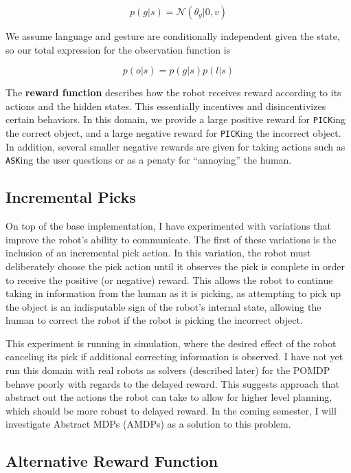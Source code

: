 \documentclass{article}
\begin{document}
$$ p(g|s) = \mathcal{N}(\theta_g| 0, v)$$

We assume language and gesture are conditionally independent given the state, so our total expression for the observation function is 

$$ p(o|s) = p(g|s) p(l|s)$$


The \textbf{reward function} describes how the robot receives reward according to its actions and the hidden states. This essentially incentives and disincentivizes certain behaviors. In this domain, we provide a large positive reward for \texttt{PICK}ing the correct object, and a large negative reward for \texttt{PICK}ing the incorrect object. In addition, several smaller negative rewards are given for taking actions such as \texttt{ASK}ing the user questions or as a penaty for ``annoying'' the human. 

\subsection{Incremental Picks}

On top of the base implementation, I have experimented with variations that improve the robot's ability to communicate. The first of these variations is the inclusion of an incremental pick action. In this variation, the robot must deliberately choose the pick action until it observes the pick is complete in order to receive the positive (or negative) reward. This allows the robot to continue taking in information from the human as it is picking, as attempting to pick up the object is an indisputable sign of the robot's internal state, allowing the human to correct the robot if the robot is picking the incorrect object. 

This experiment is running in simulation, where the desired effect of the robot canceling its pick if additional correcting information is observed. I have not yet run this domain with real robots as solvers (described later) for the POMDP behave poorly with regards to the delayed reward. This suggests approach that abstract out the actions the robot can take to allow for higher level planning, which should be more robust to delayed reward. In the coming semester, I will investigate Abstract MDPs (AMDPs) as a solution to this problem. 

\subsection{Alternative Reward Function}
\end{document}
